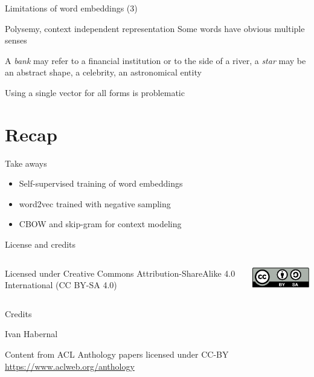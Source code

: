 \documentclass[12pt,aspectratio=169,handout]{beamer}
\begin{document}
\begin{frame}{Limitations of word embeddings (3)}
	
\begin{block}{Polysemy, context independent representation}
Some words have obvious multiple senses

A \emph{bank} may refer to a financial institution or to the side of a river, a \emph{star} may be an abstract shape, a celebrity, an astronomical entity

Using a single vector for all forms	is problematic
\end{block}


\end{frame}


\section*{Recap}



\begin{frame}{Take aways}
	
\begin{itemize}
	\item Self-supervised training of word embeddings
	\item word2vec trained with negative sampling
	\item CBOW and skip-gram for context modeling
\end{itemize}
	
\end{frame}



\begin{frame}{License and credits}

	\begin{columns}
		\begin{column}{0.7\textwidth}
			Licensed under Creative Commons Attribution-ShareAlike 4.0 International (CC BY-SA 4.0)
		\end{column}
		\begin{column}{0.2\textwidth}
			\includegraphics[width=0.9\linewidth]{img/cc-by-sa-icon.pdf}
		\end{column}
	\end{columns}
	
	\bigskip
	
	Credits
	
	\begin{scriptsize}
		
		Ivan Habernal
		
		Content from ACL Anthology papers licensed under CC-BY \url{https://www.aclweb.org/anthology}
		
	
	\end{scriptsize}
	
\end{frame}
\end{document}
